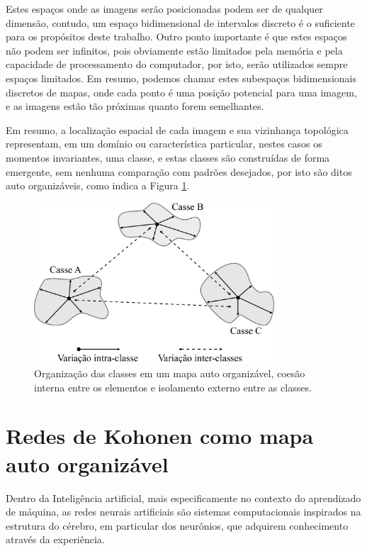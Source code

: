 Estes espaços onde as imagens serão posicionadas podem ser de qualquer dimensão,
contudo, um espaço bidimensional de intervalos discreto é o suficiente para os
propósitos deste trabalho. Outro ponto importante é que estes espaços não podem
ser infinitos, pois obviamente estão limitados pela memória e pela capacidade
de processamento do computador, por isto, serão utilizados sempre espaços
limitados. Em resumo, podemos chamar estes subespaços bidimensionais discretos
de mapas, onde cada ponto é uma posição potencial para uma imagem, e as imagens
estão tão próximas quanto forem semelhantes.

Em resumo, a localização espacial de cada imagem e sua vizinhança topológica
representam, em um domínio ou característica particular, nestes casos os
momentos invariantes, uma classe, e estas classes são construídas de forma
emergente, sem nenhuma comparação com padrões desejados, por isto são ditos
auto organizáveis, como indica a Figura \ref{fig:mapa_classes_dist}.

\begin{figure}[H]
  \begin{center}
    \includegraphics[height=6cm]{imagens/mapa_classes_dist.pdf}
  \end{center}
  \caption{ Organização das classes em um mapa auto organizável, coesão interna
    entre os elementos e isolamento externo entre as classes. }
  \label{fig:mapa_classes_dist}
\end{figure}

\section{Redes de Kohonen como mapa auto organizável}\label{sec:redes_kohonen_mapas}

Dentro da Inteligência artificial, mais especificamente no contexto do
aprendizado de máquina, as redes neurais artificiais são sistemas computacionais
inspirados na estrutura do cérebro, em particular dos neurônios, que adquirem
conhecimento através da experiência.

